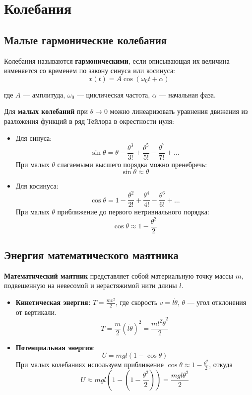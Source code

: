 \section{Колебания}

\subsection{Малые гармонические колебания}
Колебания называются \textbf{гармоническими}, если описывающая их величина изменяется со временем по закону синуса или косинуса:
\[
x(t) = A \cos(\omega_0 t + \alpha)
\]

где $A$ — амплитуда, $\omega_0$ — циклическая частота, $\alpha$ — начальная фаза. 

Для \textbf{малых колебаний} при \( \theta\to 0 \) можно линеаризовать уравнения движения из разложения функций в ряд Тейлора в окрестности нуля:

\begin{itemize}
    \item Для синуса:
    \[
    \sin \theta = \theta - \frac{\theta^3}{3!} + \frac{\theta^5}{5!} - \frac{\theta^7}{7!} + \dots
    \]
    При малых \( \theta \) слагаемыми высшего порядка можно пренебречь:
    \[
    \sin \theta \approx \theta
    \]

    \item Для косинуса:
    \[
    \cos \theta = 1 - \frac{\theta^2}{2!} + \frac{\theta^4}{4!} - \frac{\theta^6}{6!} + \dots
    \]
    При малых $\theta$ приближение до первого нетривиального порядка:
    \[
    \cos \theta \approx 1 - \frac{\theta^2}{2}
    \]
\end{itemize}

\subsection{Энергия математического маятника}

\textbf{Математический маятник} представляет собой материальную точку массы \( m \), подвешенную на невесомой и нерастяжимой нити длины \( l \). 

\begin{itemize}
    \item \textbf{Кинетическая энергия:} \( T = \frac{mv^2}{2} \), где скорость \( v = l\dot{\theta} \), \( \theta \) — угол отклонения от вертикали.
    \[
    T = \frac{m}{2} (l\dot{\theta})^2 = \frac{ml^2\dot{\theta}^2}{2}
    \]
    
    \item \textbf{Потенциальная энергия}:
    \[
    U = mgl(1 - \cos\theta)
    \]
    При малых колебаниях используем приближение \( \cos\theta \approx 1 - \frac{\theta^2}{2} \), откуда
    \[
    U \approx mgl\left(1 - \left(1 - \frac{\theta^2}{2}\right)\right) = \frac{mgl\theta^2}{2}
    \]
\end{itemize}

